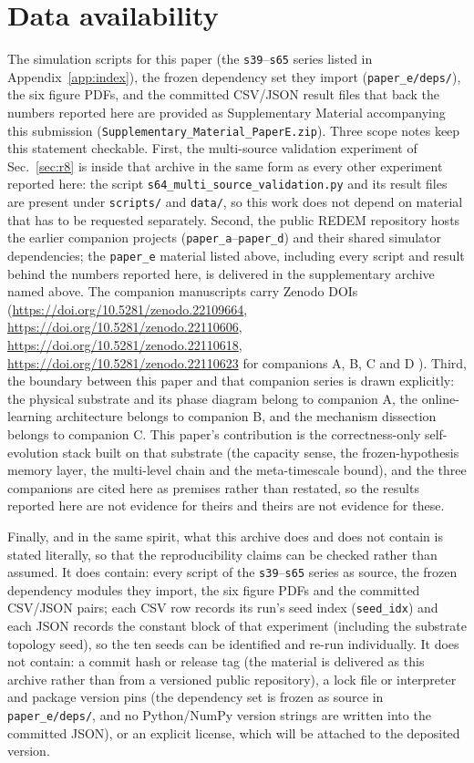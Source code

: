 \documentclass[preprint,12pt]{elsarticle}
\begin{document}
\section*{Data availability}
The simulation scripts for this paper (the \texttt{s39}--\texttt{s65}
series listed in Appendix~\ref{app:index}), the frozen dependency set they
import (\texttt{paper\_e/deps/}), the six figure PDFs, and the committed
CSV/JSON result files that back the numbers reported here are provided as
Supplementary Material accompanying this submission
(\texttt{Supplementary\_Material\_PaperE.zip}). Three scope notes keep this
statement checkable. First, the multi-source validation experiment of
Sec.~\ref{sec:r8} is inside that archive in the same form as every other
experiment reported here: the script \texttt{s64\_multi\_source\_validation.py}
and its result files are present under \texttt{scripts/} and \texttt{data/}, so
this work does not depend on material that has to be requested separately.
Second, the public REDEM repository \cite{redemrepo}
hosts the earlier companion
projects (\texttt{paper\_a}--\texttt{paper\_d}) and their shared simulator
dependencies; the \texttt{paper\_e} material listed above, including every
script and result behind the numbers reported here, is delivered in the
supplementary archive named above. The companion
manuscripts carry Zenodo DOIs
(\url{https://doi.org/10.5281/zenodo.22109664},
\url{https://doi.org/10.5281/zenodo.22110606},
\url{https://doi.org/10.5281/zenodo.22110618},
\url{https://doi.org/10.5281/zenodo.22110623} for companions A, B, C and D
\cite{companionA,companionB,companionC,companionD}). Third, the boundary between
this paper and that companion series is drawn explicitly: the physical
substrate and its phase diagram belong to companion A, the online-learning
architecture belongs to companion B, and the mechanism dissection belongs to
companion C. This paper's contribution is the correctness-only self-evolution
stack built on that substrate (the capacity sense, the frozen-hypothesis memory
layer, the multi-level chain and the meta-timescale bound), and the three
companions are cited here as premises rather than restated, so the results
reported here are not evidence for theirs and theirs are not evidence for
these.

Finally, and in the same
spirit, what this archive does and does not contain is stated literally, so
that the reproducibility claims can be checked rather than assumed. It does contain: every script of the
\texttt{s39}--\texttt{s65} series as source, the frozen dependency modules they
import, the six figure PDFs and the committed CSV/JSON pairs; each CSV row
records its run's seed index (\texttt{seed\_idx}) and each JSON records the
constant block of that experiment (including the substrate topology seed), so
the ten seeds can be identified and re-run individually. It does not contain:
a commit hash or release tag (the material is delivered as this archive rather
than from a versioned public repository), a lock file or interpreter and
package version pins (the dependency set is frozen as source in
\texttt{paper\_e/deps/}, and no Python/NumPy version strings are written into
the committed JSON), or an explicit license, which will be attached to the
deposited version.
\end{document}
